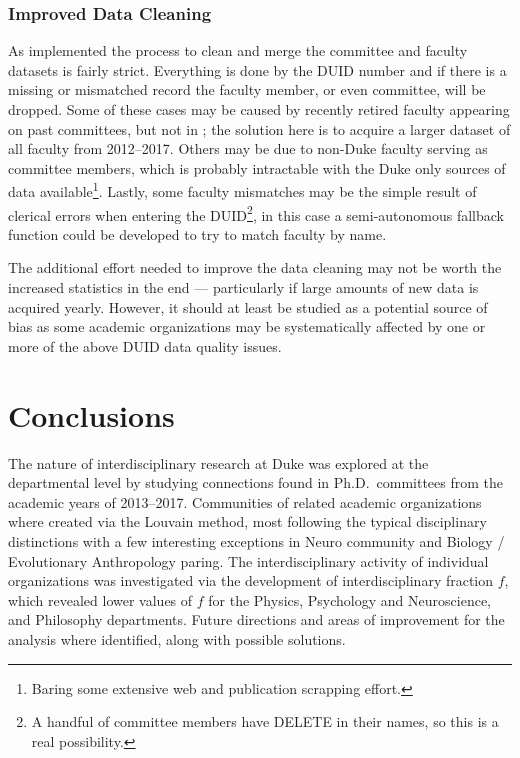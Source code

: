 \documentclass[notitlepage,aps,prd,nofootinbib]{revtex4-1}
\begin{document}
\subsubsection{Improved Data Cleaning}
As implemented the process to clean and merge the committee and faculty datasets is fairly strict. Everything is done by the DUID number and if there is a missing or mismatched record the faculty member, or even committee, will be dropped. Some of these cases may be caused by recently retired faculty appearing on past committees, but not in ; the solution here is to acquire a larger dataset of all faculty from 2012--2017. Others may be due to non-Duke faculty serving as committee members, which is probably intractable with the Duke only sources of data available\footnote{Baring some extensive web and publication scrapping effort.}. Lastly, some faculty mismatches may be the simple result of clerical errors when entering the DUID\footnote{A handful of committee members have DELETE in their names, so this is a real possibility.}, in this case a semi-autonomous fallback function could be developed to try to match faculty by name.

The additional effort needed to improve the data cleaning may not be worth the increased statistics in the end --- particularly if large amounts of new data is acquired yearly. However, it should at least be studied as a potential source of bias as some academic organizations may be systematically affected by one or more of the above DUID data quality issues.


\section{Conclusions}
The nature of interdisciplinary research at Duke was explored at the departmental level by studying connections found in Ph.D.\ committees from the academic years of 2013--2017. Communities of related academic organizations where created via the Louvain method, most following the typical disciplinary distinctions with a few interesting exceptions in Neuro community and Biology / Evolutionary Anthropology paring. The interdisciplinary activity of individual organizations was investigated via the development of interdisciplinary fraction $f$, which revealed lower values of $f$ for the Physics, Psychology and Neuroscience, and Philosophy departments. Future directions and areas of improvement for the analysis where identified, along with possible solutions. 
\end{document}
